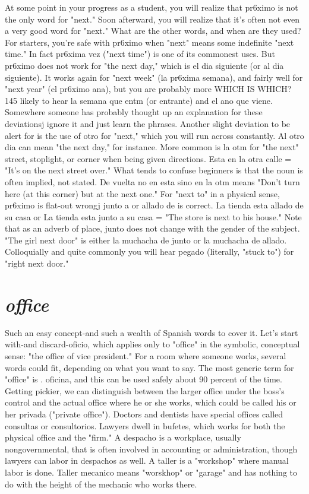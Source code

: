 At some point in your progress as a student, you will realize
that pr6ximo is not the only word for "next." Soon afterward, you will
realize that it's often not even a very good word for "next." What are
the other words, and when are they used? For starters, you're safe with
pr6ximo when "next" means some indefinite "next time." In fact
pr6xima vez ("next time") is one of its commonest uses. But pr6ximo
does not work for "the next day," which is el dia siguiente (or al dia
siguiente). It works again for "next week" (la pr6xima semana), and
fairly well for "next year" (el pr6ximo ana), but you are probably more
WHICH IS WHICH? 145
likely to hear la semana que entm (or entrante) and el ano que viene.
Somewhere someone has probably thought up an explanation for these
deviationsj ignore it and just learn the phrases.
Another slight deviation to be alert for is the use of otro for
"next," which you will run across constantly. Al otro dia can mean
"the next day," for instance. More common is la otm for "the next"
street, stoplight, or corner when being given directions. Esta en la otra
calle = "It's on the next street over." What tends to confuse beginners
is that the noun is often implied, not stated. De vuelta no en esta sino
en la otm means "Don't turn here (at this corner) but at the next one."
For "next to" in a physical sense, pr6ximo is flat-out wrongj
junto a or allado de is correct. La tienda esta allado de su casa or La
tienda esta junto a su casa = "The store is next to his house." Note
that as an adverb of place, junto does not change with the gender of
the subject. "The girl next door" is either la muchacha de junto or la
muchacha de allado. Colloquially and quite commonly you will hear
pegado (literally, "stuck to") for "right next door."

\section{\emph{office}}

Such an easy concept-and such a wealth of Spanish words to
cover it. Let's start with-and discard-oficio, which applies only to
"office" in the symbolic, conceptual sense: "the office of vice president." For a room where someone works, several words could fit, depending on what you want to say. The most generic term for "office" is
. oficina, and this can be used safely about 90 percent of the time. Getting pickier, we can distinguish between the larger office under the
boss's control and the actual office where he or she works, which could
be called his or her privada ("private office"). Doctors and dentists
have special offices called consultas or consultorios. Lawyers dwell in
bufetes, which works for both the physical office and the "firm." A
despacho is a workplace, usually nongovernmental, that is often involved in accounting or administration, though lawyers can labor in
despachos as well. A taller is a "workshop" where manual labor is
done. Taller mecanico means "worskhop" or "garage" and has nothing
to do with the height of the mechanic who works there.

